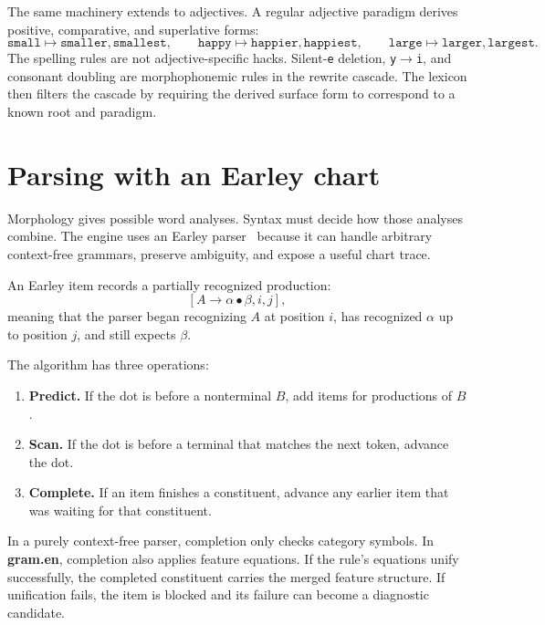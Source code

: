 \documentclass[11pt]{article}
\theoremstyle{definition}
\theoremstyle{plain}
\theoremstyle{remark}
\newcommand{\Gram}{\textbf{gram.en}}
\begin{document}
The same machinery extends to adjectives. A regular adjective paradigm derives
positive, comparative, and superlative forms:
\[
  \texttt{small} \mapsto \texttt{smaller}, \texttt{smallest},
  \qquad
  \texttt{happy} \mapsto \texttt{happier}, \texttt{happiest},
  \qquad
  \texttt{large} \mapsto \texttt{larger}, \texttt{largest}.
\]
The spelling rules are not adjective-specific hacks. Silent-\texttt{e} deletion,
\texttt{y}\(\to\)\texttt{i}, and consonant doubling are morphophonemic rules in
the rewrite cascade. The lexicon then filters the cascade by requiring the
derived surface form to correspond to a known root and paradigm.

\section{Parsing with an Earley chart}

Morphology gives possible word analyses. Syntax must decide how those analyses combine. The
engine uses an Earley parser~\cite{earley1970} because it can handle arbitrary context-free
grammars, preserve ambiguity, and expose a useful chart trace.

An Earley item records a partially recognized production:
\[
  [A \to \alpha \bullet \beta, i, j],
\]
meaning that the parser began recognizing $A$ at position $i$, has recognized $\alpha$ up to
position $j$, and still expects $\beta$.

The algorithm has three operations:
\begin{enumerate}[leftmargin=2em]
  \item \textbf{Predict.} If the dot is before a nonterminal $B$, add items for productions of $B$.
  \item \textbf{Scan.} If the dot is before a terminal that matches the next token, advance the dot.
  \item \textbf{Complete.} If an item finishes a constituent, advance any earlier item that was
        waiting for that constituent.
\end{enumerate}

In a purely context-free parser, completion only checks category symbols. In \Gram{}, completion
also applies feature equations. If the rule's equations unify successfully, the completed
constituent carries the merged feature structure. If unification fails, the item is blocked and
its failure can become a diagnostic candidate.
\end{document}
